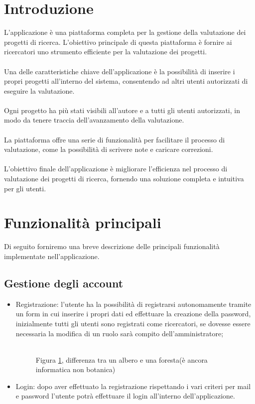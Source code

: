 \documentclass{article}
\begin{document}
\section{Introduzione}
L'applicazione è una piattaforma completa per la gestione della valutazione dei progetti di ricerca. L'obiettivo principale di questa piattaforma è fornire ai ricercatori uno strumento efficiente per la valutazione dei progetti.\\\\Una delle caratteristiche chiave dell'applicazione è la possibilità di inserire i propri progetti all'interno del sistema, consentendo ad altri utenti autorizzati di eseguire la valutazione.\\\\Ogni progetto ha più stati visibili all'autore e a tutti gli utenti autorizzati, in modo da tenere traccia dell'avanzamento della valutazione.\\\\La piattaforma offre una serie di funzionalità  per facilitare il processo di valutazione, come la possibilità di scrivere note e caricare correzioni.\\\\L'obiettivo finale dell'applicazione è migliorare l'efficienza nel processo di valutazione dei progetti di ricerca, fornendo una soluzione completa e intuitiva per gli utenti.
\section{Funzionalità principali}
Di seguito forniremo una breve descrizione delle principali funzionalità implementate nell'applicazione. 
\subsection{Gestione degli account}
\begin{itemize}
    \item Registrazione: l'utente ha la possibilità di registrarsi autonomamente tramite un form in cui inserire i propri dati ed effettuare la creazione della password, inizialmente tutti gli utenti sono registrati come ricercatori, se dovesse essere necessaria la modifica di un ruolo sarà compito dell'amministratore;
    \begin{figure}[H]
        \centering
        \\
        \label{foresta.png} Figura \ref{foresta.png}, differenza tra un albero e una foresta(è ancora informatica non botanica)
    \end{figure}
    \item Login: dopo aver effettuato la registrazione rispettando i vari criteri per mail e password l'utente potrà effettuare il login all'interno dell'applicazione. 
\end{itemize}
\end{document}
